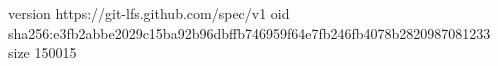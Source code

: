 version https://git-lfs.github.com/spec/v1
oid sha256:e3fb2abbe2029c15ba92b96dbffb746959f64e7fb246fb4078b2820987081233
size 150015
